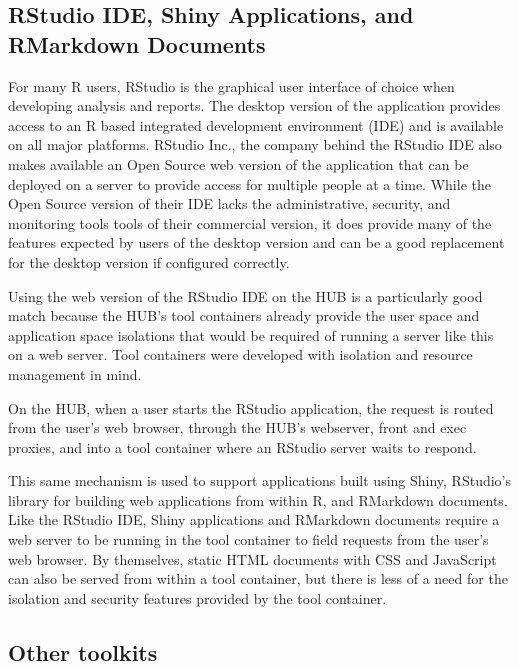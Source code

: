 \documentclass[conference]{../sty/IEEEtran}
\begin{document}
\subsection {RStudio IDE, Shiny Applications, and RMarkdown Documents}

For many R users, RStudio is the graphical user interface of choice when
developing analysis and reports. The desktop version of the application
provides access to an R based integrated development environment (IDE) and is
available on all major platforms. RStudio Inc., the company behind the RStudio
IDE also makes available an Open Source web version of the application that can
be deployed on a server to provide access for multiple people at a time. While
the Open Source version of their IDE lacks the administrative, security, and
monitoring tools tools of their commercial version, it does provide many of the
features expected by users of the desktop version and can be a good replacement
for the desktop version if configured correctly.

Using the web version of the RStudio IDE on the HUB is a particularly good
match because the HUB's tool containers already provide the user space and
application space isolations that would be required of running a server like
this on a web server. Tool containers were developed with isolation and
resource management in mind.

On the HUB, when a user starts the RStudio application, the request is routed
from the user's web browser, through the HUB's webserver, front and exec
proxies, and into a tool container where an RStudio server waits to respond.

This same mechanism is used to support applications built using Shiny,
RStudio's library for building web applications from within R, and RMarkdown
documents. Like the RStudio IDE, Shiny applications and RMarkdown documents
require a web server to be running in the tool container to field requests from
the user's web browser. By themselves, static HTML documents with CSS and JavaScript
can also be served from within a tool container, but there is less of a need
for the isolation and security features provided by the tool container.



\subsection {Other toolkits}
\end{document}
